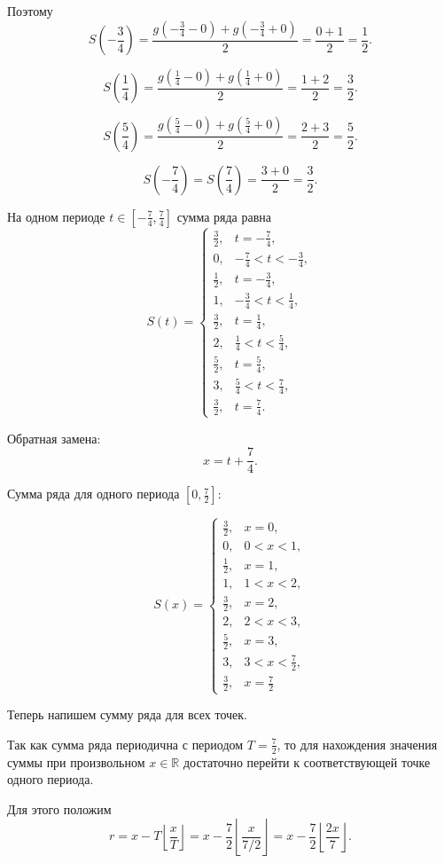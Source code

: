\documentclass[12pt,a4paper]{article}
\begin{document}
Поэтому
\[
S\left(-\frac34\right)=\frac{g(-\frac34 - 0) + g(- \frac34 + 0)}{2}=\frac{0+1}{2}=\frac12.
\]

\[
S\left(\frac14\right)=\frac{g(\frac14 - 0) + g(\frac14 + 0)}{2}=\frac{1+2}{2}=\frac32.
\]

\[
S\left(\frac54\right)=\frac{g(\frac54 - 0) + g(\frac54 + 0)}{2}=\frac{2+3}{2}=\frac52.
\]

\[
S\left(-\frac74\right)=S\left(\frac74\right)=\frac{3+0}{2}=\frac32.
\]

На одном периоде $t\in\left[-\frac74,\frac74\right]$ сумма ряда равна
\[
S(t)=
\begin{cases}
\frac32, & t=-\frac74,\\[2mm]
0, & -\frac74<t<-\frac34,\\[2mm]
\frac12, & t=-\frac34,\\[2mm]
1, & -\frac34<t<\frac14,\\[2mm]
\frac32, & t=\frac14,\\[2mm]
2, & \frac14<t<\frac54,\\[2mm]
\frac52, & t=\frac54,\\[2mm]
3, & \frac54<t<\frac74,\\[2mm]
\frac32, & t=\frac74.
\end{cases}
\]

Обратная замена:
\[
x=t+\frac74.
\]

Сумма ряда для одного периода $[0,\frac72]$:

\[
S(x)=
\begin{cases}
\frac32, & x=0,\\[2mm]
0, & 0<x<1,\\[2mm]
\frac12, & x=1,\\[2mm]
1, & 1<x<2,\\[2mm]
\frac32, & x=2,\\[2mm]
2, & 2<x<3,\\[2mm]
\frac52, & x=3,\\[2mm]
3, & 3<x<\frac72,\\[2mm]
\frac32, & x=\frac72
\end{cases}
\]

Теперь напишем сумму ряда для всех точек.

Так как сумма ряда периодична с периодом $T=\frac72$,
то для нахождения значения суммы при произвольном \(x\in\mathbb R\)
достаточно перейти к соответствующей точке одного периода.

Для этого положим
\[
r=x-T\left\lfloor \frac{x}{T}\right\rfloor
=
x-\frac72\left\lfloor \frac{x}{7/2}\right\rfloor
=
x-\frac72\left\lfloor \frac{2x}{7}\right\rfloor.
\]
\end{document}
